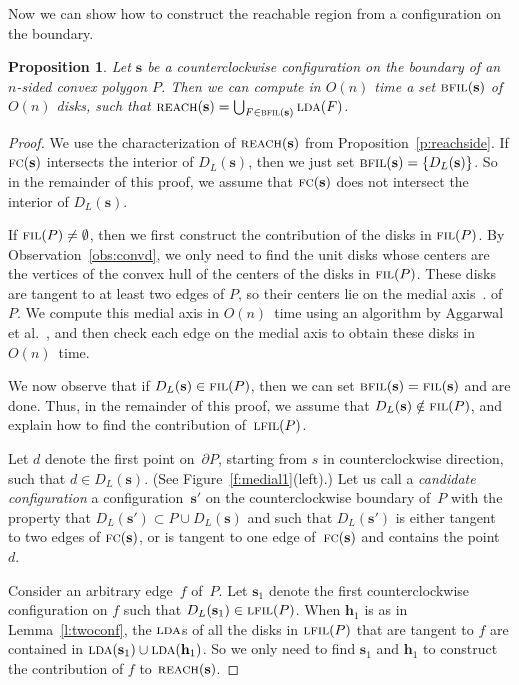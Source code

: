 \documentclass[a4paper]{article}
\newcommand{\vecs}{{\mathbf{s}}}
\newcommand{\vech}{{\mathbf{h}}}
\newcommand{\ldisk}{{D_L}}
\newcommand{\bd}{\partial}
\DeclareMathOperator{\reach}{\textsc{reach}}
\DeclareMathOperator{\FIL}{\textsc{fil}}
\DeclareMathOperator{\BFIL}{\textsc{bfil}}
\DeclareMathOperator{\LFIL}{\textsc{lfil}}
\DeclareMathOperator{\LDA}{\textsc{lda}}
\DeclareMathOperator{\FC}{\textsc{fc}}
\newtheorem{prop}[theorem]{Proposition}
\begin{document}
Now we can show how to construct the reachable region from a
configuration on the boundary.
\begin{prop}
  \label{p:computeside}
  Let $\vecs$ be a counterclockwise configuration on the boundary of
  an $n$-sided convex polygon $P$.  Then we can compute in $O(n)$ time
  a set $\BFIL(\vecs)$ of $O(n)$ disks, such that
  $\reach(\vecs)=\bigcup_{F \in \BFIL(\vecs)} \LDA(F)$.
\end{prop}
\begin{proof}
  We use the characterization of $\reach(\vecs)$ from
  Proposition~\ref{p:reachside}.  If $\FC(\vecs)$ intersects the
  interior of $\ldisk(\vecs)$, then we just set
  $\BFIL(\vecs)=\{\ldisk(\vecs)\}$.  So in the remainder of this
  proof, we assume that $\FC(\vecs)$ does not intersect the interior
  of $\ldisk(\vecs)$.

  If $\FIL(P) \neq \emptyset$, then we first construct the
  contribution of the disks in $\FIL(P)$. By
  Observation~\ref{obs:convd}, we only need to find the unit disks
  whose centers are the vertices of the convex hull of the centers of
  the disks in $\FIL(P)$. These disks are tangent to at least two
  edges of $P$, so their centers lie on the medial
  axis~\cite{agss-ltacv-89,csw-fmasp-99}.  of $P$. We compute this
  medial axis in $O(n)$~time using an algorithm by Aggarwal et
  al.~\cite{agss-ltacv-89}, and then check each edge on the medial
  axis to obtain these disks in $O(n)$~time.

  We now observe that if $\ldisk(\vecs) \in \FIL(P)$, then we can set
  $\BFIL(\vecs) = \FIL(\vecs)$ and are done.
  Thus, in the remainder of this proof, we assume that
  $\ldisk(\vecs) \notin \FIL(P)$, and explain how to find the
  contribution of~$\LFIL(P)$.  

  Let $d$ denote the first point on~$\bd P$, starting from $s$ in
  counterclockwise direction, such that $d \in \ldisk(\vecs)$.  (See
  Figure~\ref{f:medial1}(left).)   Let us call a \emph{candidate
    configuration} a configuration~$\vecs'$ on the counterclockwise
  boundary of~$P$ with the property that $\ldisk(\vecs') \subset P
  \cup \ldisk(\vecs)$ and such that $\ldisk(\vecs')$ is either tangent
  to two edges of $\FC(\vecs)$, or is tangent to one edge
  of~$\FC(\vecs)$ and contains the point~$d$.

  Consider an arbitrary edge~$f$ of~$P$.  Let $\vecs_1$ denote the
  first counterclockwise configuration on $f$ 
  such that $\ldisk(\vecs_1) \in \LFIL(P)$. When $\vech_1$ is as in
  Lemma~\ref{l:twoconf}, the $\LDA$s of all the disks in $\LFIL(P)$
  that are tangent to $f$ are contained in $\LDA(\vecs_1) \cup
  \LDA(\vech_1)$. So we only need to find $\vecs_1$ and $\vech_1$ to
  construct the contribution of $f$ to $\reach(\vecs)$.


\end{proof}
\end{document}
